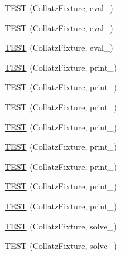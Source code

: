 \begin{DoxyCompactItemize}
\hyperlink{TestCollatz_8c_09_09_a2e12d9c89f94e5227e499d7703f9dfaa}{T\-E\-S\-T} (Collatz\-Fixture, eval\-\_)
\item 
\hyperlink{TestCollatz_8c_09_09_a8857cd942908a7bb202c0fb613a008ce}{T\-E\-S\-T} (Collatz\-Fixture, eval\-\_)
\item 
\hyperlink{TestCollatz_8c_09_09_a4a99476c845b27c020c894ff56c5331e}{T\-E\-S\-T} (Collatz\-Fixture, eval\-\_)
\item 
\hyperlink{TestCollatz_8c_09_09_a4bb3bce9465d20c35ec420e187f958c8}{T\-E\-S\-T} (Collatz\-Fixture, print\-\_)
\item 
\hyperlink{TestCollatz_8c_09_09_a710b14401102f6b4647268dd499a6c63}{T\-E\-S\-T} (Collatz\-Fixture, print\-\_)
\item 
\hyperlink{TestCollatz_8c_09_09_a3395d41febaedb3e4da972563e0cd383}{T\-E\-S\-T} (Collatz\-Fixture, print\-\_)
\item 
\hyperlink{TestCollatz_8c_09_09_ab955fb99f29049a09141ef516e672f4f}{T\-E\-S\-T} (Collatz\-Fixture, print\-\_)
\item 
\hyperlink{TestCollatz_8c_09_09_adc7e320a34f5061bd7a8011e47dc0f7b}{T\-E\-S\-T} (Collatz\-Fixture, print\-\_)
\item 
\hyperlink{TestCollatz_8c_09_09_a16aff1698853f8f5f5fe0a170dcd5ba5}{T\-E\-S\-T} (Collatz\-Fixture, print\-\_)
\item 
\hyperlink{TestCollatz_8c_09_09_a643e8e840d9a3feaaaa9d096fd743b00}{T\-E\-S\-T} (Collatz\-Fixture, print\-\_)
\item 
\hyperlink{TestCollatz_8c_09_09_a0f996a68f20cd908ff5194acad751693}{T\-E\-S\-T} (Collatz\-Fixture, print\-\_)
\item 
\hyperlink{TestCollatz_8c_09_09_a3a16aafdd5586fe2f7442e7530e2ab6f}{T\-E\-S\-T} (Collatz\-Fixture, solve\-\_)
\item 
\hyperlink{TestCollatz_8c_09_09_a231d54f2c8c30622abc04e3e0fddb29f}{T\-E\-S\-T} (Collatz\-Fixture, solve\-\_)
\end{DoxyCompactItemize}



